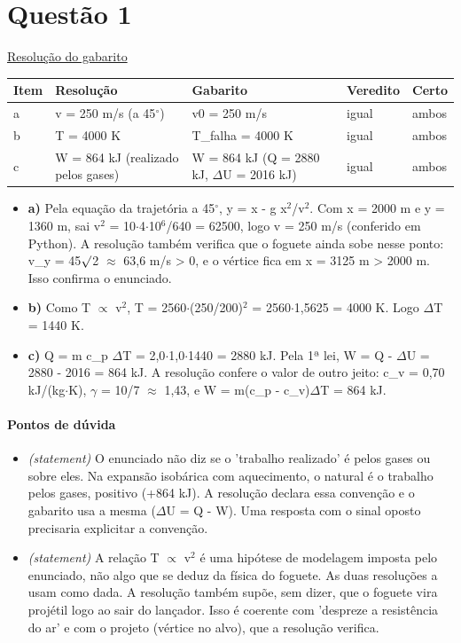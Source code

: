 \documentclass{article}%
\begin{document}
\section*{Questão 1}%
\href{https://poliedroresolve.sistemapoliedro.com.br/vestibulares/ime/2027/ime-2-fase-dia-2-27-10-2026-2-fase-dia-2/dissertativa-1-fisica-2-fase-dia-2-ime-2027}{Resolução do gabarito}\par\smallskip%
\begin{longtable}{@{}p{} p{} p{} p{} p{}@{}}\toprule Item & Resolução & Gabarito & Veredito & Certo \\ \midrule
a & v = 250 m/s (a 45$^\circ$) & v0 = 250 m/s & igual & ambos \\
b & T = 4000 K & T\_falha = 4000 K & igual & ambos \\
c & W = 864 kJ (realizado pelos gases) & W = 864 kJ (Q = 2880 kJ, $\Delta$U = 2016 kJ) & igual & ambos \\
\bottomrule\end{longtable}%
\begin{itemize}%
\item%
\textbf{a)} Pela equação da trajetória a 45$^\circ$, y = x - g x$^2$/v$^2$. Com x = 2000 m e y = 1360 m, sai v$^2$ = 10$\cdot$4$\cdot$10$^{6}$/640 = 62500, logo v = 250 m/s (conferido em Python). A resolução também verifica que o foguete ainda sobe nesse ponto: v\_y = 45$\surd$2 $\approx$ 63,6 m/s > 0, e o vértice fica em x = 3125 m > 2000 m. Isso confirma o enunciado.%
\item%
\textbf{b)} Como T $\propto$ v$^2$, T = 2560$\cdot$(250/200)$^2$ = 2560$\cdot$1,5625 = 4000 K. Logo $\Delta$T = 1440 K.%
\item%
\textbf{c)} Q = m c\_p $\Delta$T = 2,0$\cdot$1,0$\cdot$1440 = 2880 kJ. Pela 1ª lei, W = Q - $\Delta$U = 2880 - 2016 = 864 kJ. A resolução confere o valor de outro jeito: c\_v = 0,70 kJ/(kg$\cdot$K), $\gamma$ = 10/7 $\approx$ 1,43, e W = m(c\_p - c\_v)$\Delta$T = 864 kJ.%
\end{itemize}%
\paragraph{Pontos de dúvida}%
\begin{itemize}%
\item%
\textit{(statement)} O enunciado não diz se o 'trabalho realizado' é pelos gases ou sobre eles. Na expansão isobárica com aquecimento, o natural é o trabalho pelos gases, positivo (+864 kJ). A resolução declara essa convenção e o gabarito usa a mesma ($\Delta$U = Q - W). Uma resposta com o sinal oposto precisaria explicitar a convenção.%
\item%
\textit{(statement)} A relação T $\propto$ v$^2$ é uma hipótese de modelagem imposta pelo enunciado, não algo que se deduz da física do foguete. As duas resoluções a usam como dada. A resolução também supõe, sem dizer, que o foguete vira projétil logo ao sair do lançador. Isso é coerente com 'despreze a resistência do ar' e com o projeto (vértice no alvo), que a resolução verifica.%
\end{itemize}%
\end{document}
